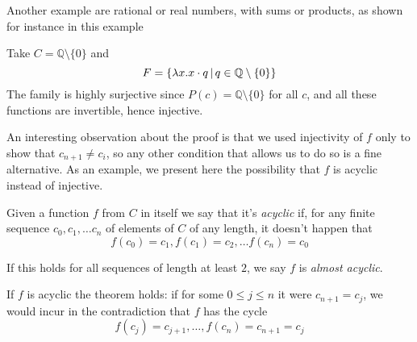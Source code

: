 Another example are rational or real numbers, with sums or products, as shown for instance in this example
\begin{example}
	Take $C = \mathbb{Q} \setminus \{ 0 \}$ and
	\[
	F = \{ \lambda x. x \cdot q \,\vert\, q \in \mathbb{Q} \setminus \{ 0 \} \}
	\]
	The family is highly surjective since $P(c) = \mathbb{Q} \setminus \{ 0 \}$ for all $c$, and all these functions are invertible, hence injective.
\end{example}

An interesting observation about the proof is that we used injectivity of $f$ only to show that $c_{n+1} \neq c_i$, so any other condition that allows us to do so is a fine alternative. As an example, we present here the possibility that $f$ is acyclic instead of injective.
\begin{definition}
	Given a function $f$ from $C$ in itself we say that it's \textit{acyclic} if, for any finite sequence $c_0, c_1, \dots c_n$ of elements of $C$ of any length, it doesn't happen that
	\[
	f(c_0) = c_1, f(c_1) = c_2, \dots f(c_n) = c_0
	\]

	If this holds for all sequences of length at least $2$, we say $f$ is \textit{almost acyclic}.
\end{definition}
If $f$ is acyclic the theorem holds: if for some $0 \le j \le n$ it were $c_{n+1} = c_j$, we would incur in the contradiction that $f$ has the cycle
\[
f(c_j) = c_{j+1}, \dots, f(c_n) = c_{n+1} = c_j
\]

